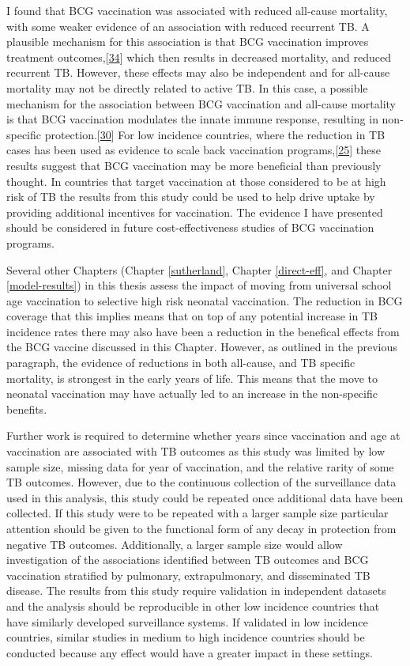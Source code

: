 \documentclass[11pt,twoside]{bristolthesis}
\begin{document}
  I found that BCG vaccination was associated with reduced all-cause mortality, with some weaker evidence of an association with reduced recurrent TB. A plausible mechanism for this association is that BCG vaccination improves treatment outcomes,{[}\protect\hyperlink{ref-Jeremiah2010}{34}{]} which then results in decreased mortality, and reduced recurrent TB. However, these effects may also be independent and for all-cause mortality may not be directly related to active TB. In this case, a possible mechanism for the association between BCG vaccination and all-cause mortality is that BCG vaccination modulates the innate immune response, resulting in non-specific protection.{[}\protect\hyperlink{ref-Kleinnijenhuis2012}{30}{]} For low incidence countries, where the reduction in TB cases has been used as evidence to scale back vaccination programs,{[}\protect\hyperlink{ref-Zwerling2011}{25}{]} these results suggest that BCG vaccination may be more beneficial than previously thought. In countries that target vaccination at those considered to be at high risk of TB the results from this study could be used to help drive uptake by providing additional incentives for vaccination. The evidence I have presented should be considered in future cost-effectiveness studies of BCG vaccination programs.
  
  Several other Chapters (Chapter \ref{sutherland}, Chapter \ref{direct-eff}, and Chapter \ref{model-results}) in this thesis assess the impact of moving from universal school age vaccination to selective high risk neonatal vaccination. The reduction in BCG coverage that this implies means that on top of any potential increase in TB incidence rates there may also have been a reduction in the benefical effects from the BCG vaccine discussed in this Chapter. However, as outlined in the previous paragraph, the evidence of reductions in both all-cause, and TB specific mortality, is strongest in the early years of life. This means that the move to neonatal vaccination may have actually led to an increase in the non-specific benefits.
  
  Further work is required to determine whether years since vaccination and age at vaccination are associated with TB outcomes as this study was limited by low sample size, missing data for year of vaccination, and the relative rarity of some TB outcomes. However, due to the continuous collection of the surveillance data used in this analysis, this study could be repeated once additional data have been collected. If this study were to be repeated with a larger sample size particular attention should be given to the functional form of any decay in protection from negative TB outcomes. Additionally, a larger sample size would allow investigation of the associations identified between TB outcomes and BCG vaccination stratified by pulmonary, extrapulmonary, and disseminated TB disease. The results from this study require validation in independent datasets and the analysis should be reproducible in other low incidence countries that have similarly developed surveillance systems. If validated in low incidence countries, similar studies in medium to high incidence countries should be conducted because any effect would have a greater impact in these settings.
  
\end{document}
